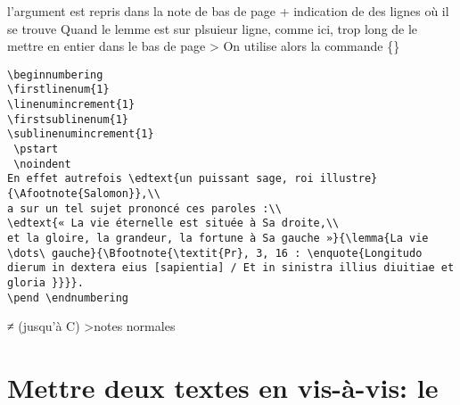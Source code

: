 l'argument  est repris dans la note de bas de page + indication de des lignes où il se trouve 
Quand le lemme est sur plsuieur ligne, comme ici, trop long de le mettre en entier dans le bas de page > On utilise alors la commande \{\}

\begin{verbatim}
\beginnumbering 
\firstlinenum{1}
\linenumincrement{1}
\firstsublinenum{1} 
\sublinenumincrement{1}
 \pstart 
 \noindent
En effet autrefois \edtext{un puissant sage, roi illustre}{\Afootnote{Salomon}},\\
a sur un tel sujet prononcé ces paroles :\\
\edtext{« La vie éternelle est située à Sa droite,\\
et la gloire, la grandeur, la fortune à Sa gauche »}{\lemma{La vie \dots\ gauche}{\Bfootnote{\textit{Pr}, 3, 16 : \enquote{Longitudo dierum in dextera eius [sapientia] / Et in sinistra illius diuitiae et gloria }}}}.
\pend \endnumbering
\end{verbatim}
≠  (jusqu'à C) >notes normales



\section{Mettre deux textes en vis-à-vis: le }
